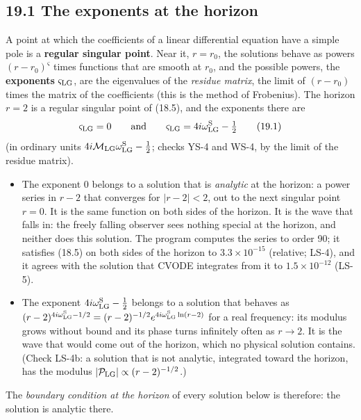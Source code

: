 \documentclass[
  10pt,
]{article}
\providecommand{\tightlist}{%
  \setlength{\itemsep}{0pt}\setlength{\parskip}{0pt}}
\begin{document}
\hypertarget{the-exponents-at-the-horizon}{%
\subsection{19.1 The exponents at the
horizon}\label{the-exponents-at-the-horizon}}

A point at which the coefficients of a linear differential equation have
a simple pole is a \textbf{regular singular point}. Near it, \(r=r_0\),
the solutions behave as powers \((r-r_0)^{\varsigma}\) times functions
that are smooth at \(r_0\), and the possible powers, the
\textbf{exponents} \(\varsigma_{\rm LG}\), are the eigenvalues of the
\emph{residue matrix}, the limit of \((r-r_0)\) times the matrix of the
coefficients (this is the method of Frobenius). The horizon \(r=2\) is a
regular singular point of (18.5), and the exponents there are
\[\varsigma_{\rm LG}=0\qquad\text{and}\qquad\varsigma_{\rm LG}=4i\omega^{\rm S}_{\rm LG}-\tfrac12\tag{19.1}\]
(in ordinary units
\(4i\mathcal M_{\rm LG}\omega^{\rm S}_{\rm LG}-\tfrac12\); checks YS-4
and WS-4, by the limit of the residue matrix).

\begin{itemize}
\tightlist
\item
  The exponent 0 belongs to a solution that is \emph{analytic} at the
  horizon: a power series in \(r-2\) that converges for
  \(\lvert r-2\rvert<2\), out to the next singular point \(r=0\). It is
  the same function on both sides of the horizon. It is the wave that
  falls in: the freely falling observer sees nothing special at the
  horizon, and neither does this solution. The program computes the
  series to order 90; it satisfies (18.5) on both sides of the horizon
  to \(3.3\times10^{-15}\) (relative; LS-4), and it agrees with the
  solution that CVODE integrates from it to \(1.5\times10^{-12}\)
  (LS-5).
\item
  The exponent \(4i\omega^{\rm S}_{\rm LG}-\tfrac12\) belongs to a
  solution that behaves as
  \((r-2)^{4i\omega^{\rm S}_{\rm LG}-1/2}=(r-2)^{-1/2}e^{4i\omega^{\rm S}_{\rm LG}\ln(r-2)}\)
  for a real frequency: its modulus grows without bound and its phase
  turns infinitely often as \(r\to2\). It is the wave that would come
  out of the horizon, which no physical solution contains. (Check LS-4b:
  a solution that is not analytic, integrated toward the horizon, has
  the modulus \(\lvert\mathcal P_{\rm LG}\rvert\propto(r-2)^{-1/2}\).)
\end{itemize}

The \emph{boundary condition at the horizon} of every solution below is
therefore: the solution is analytic there.
\end{document}

